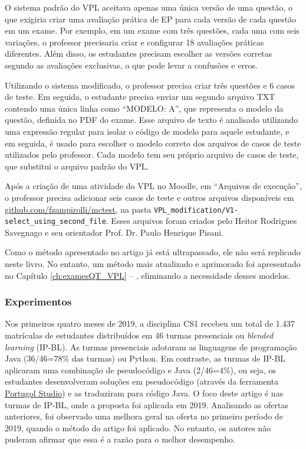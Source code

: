 O sistema padrão do VPL aceitava apenas uma única versão de uma questão, o que exigiria criar uma avaliação prática de EP para cada versão de cada questão em um exame. Por exemplo, em um exame com três questões, cada uma com seis variações, o professor precisaria criar e configurar 18 avaliações práticas diferentes. Além disso, os estudantes precisam escolher as versões corretas segundo as avaliações exclusivas, o que pode levar a confusões e erros.

Utilizando o sistema modificado, o professor precisa criar três questões e 6 casos de teste. Em seguida, o estudante precisa enviar um segundo arquivo TXT contendo uma única linha como ``MODELO: A'', que representa o modelo da questão, definida no PDF do exame. Esse arquivo de texto é analisado utilizando uma expressão regular para isolar o código de modelo para aquele estudante, e em seguida, é usado para escolher o modelo correto dos arquivos de casos de teste utilizados pelo professor. Cada modelo tem seu próprio arquivo de casos de teste, que substitui o arquivo padrão do VPL.

Após a criação de uma atividade do VPL no Moodle, em ``Arquivos de execução'', o professor precisa adicionar seis casos de teste e outros arquivos disponíveis em \href{https://github.com/fzampirolli/mctest}{github.com/fzampirolli/mctest}, na pasta \verb|VPL_modification/V1-select_using_second_file|. Esses arquivos foram criados pelo Heitor Rodrigues Savegnago e seu orientador Prof. Dr. Paulo Henrique Pisani.

Como o método apresentado no artigo já está ultrapassado, ele não será replicado neste livro. No entanto, um método mais atualizado e aprimorado foi apresentado no Capítulo \ref{ch:examesQT_VPL} -- , eliminando a necessidade desses modelos.

\subsubsection{Experimentos}

Nos primeiros quatro meses de 2019, a disciplina CS1 recebeu um total de 1.437 matrículas de estudantes distribuídos em 46 turmas presenciais ou \textit{blended learning} (IP-BL). As turmas presenciais adotaram as linguagens de programação Java (36/46=78\% das turmas) ou Python. Em contraste, as turmas de IP-BL aplicaram uma combinação de pseudocódigo e Java (2/46=4\%), ou seja, os estudantes desenvolveram soluções em pseudocódigo (através da ferramenta \href{https://univali-lite.github.io/Portugol-Studio/}{Portugol Studio}) e as traduziram  para código Java. O foco deste artigo é nas turmas de IP-BL, onde a proposta foi aplicada em 2019. Analisando as ofertas anteriores, foi observado uma melhora geral na oferta no primeiro período de 2019, quando o método do artigo foi aplicado. No entanto, os autores não puderam afirmar que essa é a razão para o melhor desempenho.

